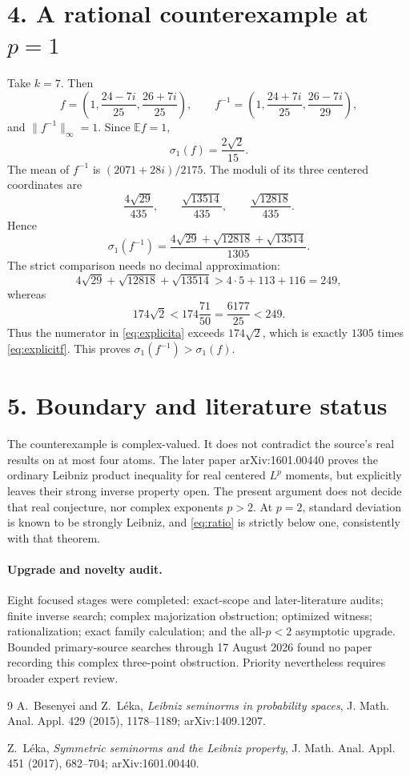 \documentclass[10pt,a4paper]{article}
\newcommand{\E}{\mathbb E}
\newcommand{\sig}{\sigma}
\begin{document}
\section*{4. A rational counterexample at \texorpdfstring{$p=1$}{p=1}}

Take $k=7$.  Then
\[
 f=\left(1,\frac{24-7i}{25},\frac{26+7i}{25}\right),
 \qquad
 f^{-1}=\left(1,\frac{24+7i}{25},\frac{26-7i}{29}\right),
\]
and $\|f^{-1}\|_\infty=1$.  Since $\E f=1$,
\begin{equation}\label{eq:explicitf}
 \sig_1(f)=\frac{2\sqrt2}{15}.
\end{equation}
The mean of $f^{-1}$ is $(2071+28i)/2175$.  The moduli of its three
centered coordinates are
\[
 \frac{4\sqrt{29}}{435},\qquad
 \frac{\sqrt{13514}}{435},\qquad
 \frac{\sqrt{12818}}{435}.
\]
Hence
\begin{equation}\label{eq:explicita}
 \sig_1(f^{-1})
 =\frac{4\sqrt{29}+\sqrt{12818}+\sqrt{13514}}{1305}.
\end{equation}
The strict comparison needs no decimal approximation:
\[
 4\sqrt{29}+\sqrt{12818}+\sqrt{13514}
 >4\cdot5+113+116=249,
\]
whereas
\[
 174\sqrt2<174\frac{71}{50}=\frac{6177}{25}<249.
\]
Thus the numerator in \eqref{eq:explicita} exceeds
$174\sqrt2$, which is exactly $1305$ times \eqref{eq:explicitf}.
This proves $\sig_1(f^{-1})>\sig_1(f)$.

\section*{5. Boundary and literature status}

The counterexample is complex-valued.  It does not contradict the source's
real results on at most four atoms.  The later paper arXiv:1601.00440 proves
the ordinary Leibniz product inequality for real centered $L^p$ moments, but
explicitly leaves their strong inverse property open.  The present argument
does not decide that real conjecture, nor complex exponents $p>2$.  At $p=2$,
standard deviation is known to be strongly Leibniz, and
\eqref{eq:ratio} is strictly below one, consistently with that theorem.

\paragraph{Upgrade and novelty audit.}
Eight focused stages were completed: exact-scope and later-literature audits;
finite inverse search; complex majorization obstruction; optimized witness;
rationalization; exact family calculation; and the all-$p<2$ asymptotic
upgrade.  Bounded primary-source searches through 17 August 2026 found no
paper recording this complex three-point obstruction.  Priority nevertheless
requires broader expert review.

\begin{thebibliography}{9}\small
{}
A.~Besenyei and Z.~L\'eka,
\emph{Leibniz seminorms in probability spaces},
J. Math. Anal. Appl. 429 (2015), 1178--1189;
arXiv:1409.1207.

Z.~L\'eka,
\emph{Symmetric seminorms and the Leibniz property},
J. Math. Anal. Appl. 451 (2017), 682--704;
arXiv:1601.00440.
\end{thebibliography}
\end{document}
